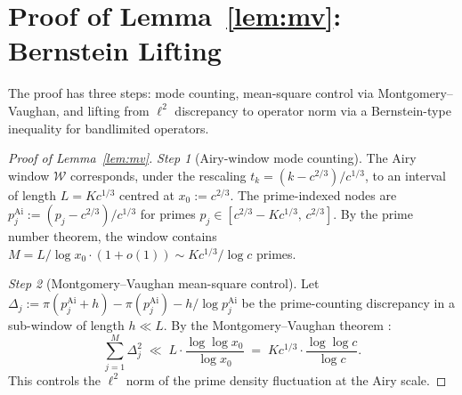 \documentclass[12pt,a4paper]{amsart}
\theoremstyle{definition}
\begin{document}
\section{Proof of Lemma~\ref{lem:mv}: Bernstein Lifting}\label{app:mv}

The proof has three steps: mode counting, mean-square control via
Montgomery--Vaughan, and lifting from $\ell^2$ discrepancy to operator norm
via a Bernstein-type inequality for bandlimited operators.

\begin{proof}[Proof of Lemma~\ref{lem:mv}]

\emph{Step 1} (Airy-window mode counting).
The Airy window $\mathcal{W}$ corresponds, under the rescaling
$t_k = (k - c^{2/3})/c^{1/3}$, to an interval of length
$L = Kc^{1/3}$ centred at $x_0 := c^{2/3}$.
The prime-indexed nodes are $p_j^{\mathrm{Ai}} := (p_j - c^{2/3})/c^{1/3}$
for primes $p_j \in [c^{2/3} - Kc^{1/3},\, c^{2/3}]$.
By the prime number theorem, the window contains
$M = L/\log x_0 \cdot (1 + o(1)) \sim Kc^{1/3}/\log c$ primes.

\emph{Step 2} (Montgomery--Vaughan mean-square control).
Let $\Delta_j := \pi(p_j^{\mathrm{Ai}} + h) - \pi(p_j^{\mathrm{Ai}}) - h/\log p_j^{\mathrm{Ai}}$
be the prime-counting discrepancy in a sub-window of length $h \ll L$.
By the Montgomery--Vaughan theorem \cite[Theorem 7.3]{MV1974}:
\begin{equation}\label{eq:MV}
  \sum_{j=1}^{M} \Delta_j^2
  \;\ll\; L\cdot\frac{\log\log x_0}{\log x_0}
  \;=\; Kc^{1/3} \cdot \frac{\log\log c}{\log c}.
\end{equation}
This controls the $\ell^2$ norm of the prime density fluctuation at the Airy scale.


\end{proof}
\end{document}
